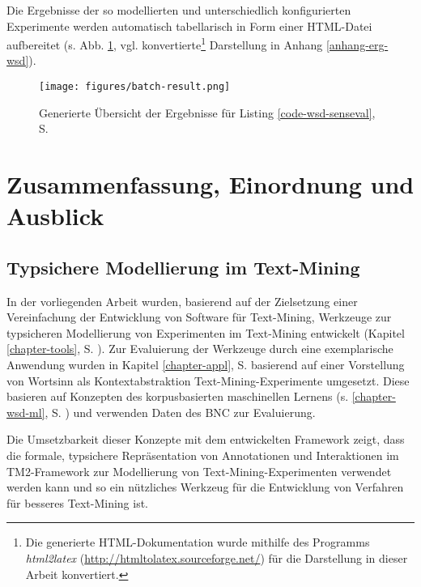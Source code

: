\documentclass[abstracton, 12pt]{scrartcl}
\begin{document}
Die Ergebnisse der so modellierten und unterschiedlich konfigurierten Experimente werden automatisch tabellarisch in Form einer HTML-Datei aufbereitet (s. Abb. \ref{generated-table}, vgl. konvertierte\footnote{Die generierte HTML-Dokumentation wurde mithilfe des Programms \emph{html2latex} (\url{http://htmltolatex.sourceforge.net/}) für die Darstellung in dieser Arbeit konvertiert.} Darstellung in Anhang \ref{anhang-erg-wsd}).

\begin{figure}
\begin{center}
  \texttt{[image: figures/batch-result.png]}
  \caption{Generierte Übersicht der Ergebnisse für Listing \ref{code-wsd-senseval}, S. \pageref{code-wsd-senseval}}
  \label{generated-table}
\end{center}
\end{figure}

\section{Zusammenfassung, Einordnung und Ausblick} \label{chapter-ausblick}

\subsection{Typsichere Modellierung im Text-Mining} \label{tm2-fazit}   

In der vorliegenden Arbeit wurden, basierend auf der Zielsetzung einer Vereinfachung der Entwicklung von Software für Text-Mining, Werkzeuge zur typsicheren Modellierung von Experimenten im Text-Mining entwickelt (Kapitel \ref{chapter-tools}, S. \pageref{chapter-tools}). Zur Evaluierung der Werkzeuge durch eine exemplarische Anwendung wurden in Kapitel \ref{chapter-appl}, S. \pageref{chapter-appl} basierend auf einer Vorstellung von Wortsinn als Kontextabstraktion Text-Mining-Experimente umgesetzt. Diese basieren auf Konzepten des korpusbasierten maschinellen Lernens (s. \ref{chapter-wsd-ml}, S. \pageref{chapter-wsd-ml}) und verwenden Daten des BNC zur Evaluierung.

Die Umsetzbarkeit dieser Konzepte mit dem entwickelten Framework zeigt, dass die formale, typsichere Repräsentation von Annotationen und Interaktionen im TM2-Framework zur Modellierung von Text-Mining-Experimenten verwendet werden kann und so ein nützliches Werkzeug für die Entwicklung von Verfahren für besseres Text-Mining ist.
\end{document}
